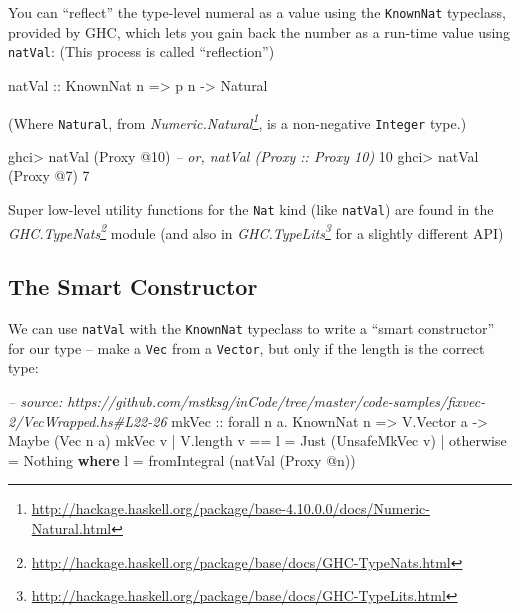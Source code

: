 \documentclass[]{article}
\newenvironment{Shaded}{}{}
\newcommand{\KeywordTok}[1]{\textcolor[rgb]{0.00,0.44,0.13}{\textbf{#1}}}
\newcommand{\DataTypeTok}[1]{\textcolor[rgb]{0.56,0.13,0.00}{#1}}
\newcommand{\DecValTok}[1]{\textcolor[rgb]{0.25,0.63,0.44}{#1}}
\newcommand{\CommentTok}[1]{\textcolor[rgb]{0.38,0.63,0.69}{\textit{#1}}}
\newcommand{\OtherTok}[1]{\textcolor[rgb]{0.00,0.44,0.13}{#1}}
\newcommand{\FunctionTok}[1]{\textcolor[rgb]{0.02,0.16,0.49}{#1}}
\newcommand{\NormalTok}[1]{#1}
\renewcommand{\href}[2]{#2\footnote{\url{#1}}}
\begin{document}
You can ``reflect'' the type-level numeral as a value using the
\texttt{KnownNat} typeclass, provided by GHC, which lets you gain back the
number as a run-time value using \texttt{natVal}: (This process is called
``reflection'')

\begin{Shaded}
\begin{Highlighting}[]
\OtherTok{natVal ::} \DataTypeTok{KnownNat}\NormalTok{ n }\OtherTok{=>}\NormalTok{ p n }\OtherTok{->} \DataTypeTok{Natural}
\end{Highlighting}
\end{Shaded}

(Where \texttt{Natural}, from
\emph{\href{http://hackage.haskell.org/package/base-4.10.0.0/docs/Numeric-Natural.html}{Numeric.Natural}},
is a non-negative \texttt{Integer} type.)

\begin{Shaded}
\begin{Highlighting}[]
\NormalTok{ghci}\FunctionTok{>}\NormalTok{ natVal (}\DataTypeTok{Proxy} \FunctionTok{@}\DecValTok{10}\NormalTok{)   }\CommentTok{-- or, natVal (Proxy :: Proxy 10)}
\DecValTok{10}
\NormalTok{ghci}\FunctionTok{>}\NormalTok{ natVal (}\DataTypeTok{Proxy} \FunctionTok{@}\DecValTok{7}\NormalTok{)}
\DecValTok{7}
\end{Highlighting}
\end{Shaded}

Super low-level utility functions for the \texttt{Nat} kind (like
\texttt{natVal}) are found in the
\emph{\href{http://hackage.haskell.org/package/base/docs/GHC-TypeNats.html}{GHC.TypeNats}}
module (and also in
\emph{\href{http://hackage.haskell.org/package/base/docs/GHC-TypeLits.html}{GHC.TypeLits}}
for a slightly different API)

\subsection{The Smart Constructor}\label{the-smart-constructor}

We can use \texttt{natVal} with the \texttt{KnownNat} typeclass to write a
``smart constructor'' for our type -- make a \texttt{Vec} from a
\texttt{Vector}, but only if the length is the correct type:

\begin{Shaded}
\begin{Highlighting}[]
\CommentTok{-- source: https://github.com/mstksg/inCode/tree/master/code-samples/fixvec-2/VecWrapped.hs#L22-26}
\OtherTok{mkVec ::}\NormalTok{ forall n a}\FunctionTok{.} \DataTypeTok{KnownNat}\NormalTok{ n }\OtherTok{=>} \DataTypeTok{V.Vector}\NormalTok{ a }\OtherTok{->} \DataTypeTok{Maybe}\NormalTok{ (}\DataTypeTok{Vec}\NormalTok{ n a)}
\NormalTok{mkVec v }\FunctionTok{|}\NormalTok{ V.length v }\FunctionTok{==}\NormalTok{ l }\FunctionTok{=} \DataTypeTok{Just}\NormalTok{ (}\DataTypeTok{UnsafeMkVec}\NormalTok{ v)}
        \FunctionTok{|}\NormalTok{ otherwise       }\FunctionTok{=} \DataTypeTok{Nothing}
  \KeywordTok{where}
\NormalTok{    l }\FunctionTok{=}\NormalTok{ fromIntegral (natVal (}\DataTypeTok{Proxy} \FunctionTok{@}\NormalTok{n))}
\end{Highlighting}
\end{Shaded}
\end{document}
